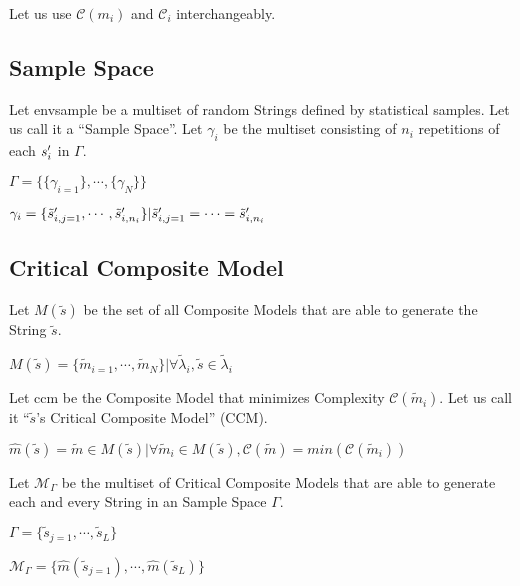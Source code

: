 \documentclass{article}
\begin{document}
Let us use $\mathcal{C}(m_i)$ and $\mathcal{C}_i$ interchangeably.

\subsection{Sample Space}

Let \gls{envsample} be a multiset of random Strings defined by statistical samples. Let us call it a ``Sample Space''. Let $\gamma_i$ be the multiset consisting of $n_i$ repetitions of each $ s_i \rq$ in $\Gamma$. 

\begin{center}

$\Gamma = \{ \{ \gamma_{i=1} \}, \cdots,  \{ \gamma_N\}\}$

$\gamma_i = \{ \tilde{s}_{i, j=1}  \rq, \cdots, \tilde{ s}_{i, n_i}  \rq \} | \tilde{ s}_{i, j=1} \rq = \cdots = \tilde{ s}_{i, n_i} \rq$

\end{center}

\subsection{Critical Composite Model}

Let $M(\tilde{ s})$ be the set of all Composite Models that are able to generate the String $\tilde{ s}$. 

\begin{center}
$M(\tilde{ s}) = \{\tilde{m}_{i=1}, \cdots, \tilde{m}_{N}\} | \forall \tilde\lambda_i, \tilde{ s} \in \tilde \lambda_i$
\end{center}

Let \gls{ccm} be the Composite Model that minimizes Complexity $\mathcal{C}(\tilde m_i)$. Let us call it ``$\tilde{ s}$'s Critical Composite Model'' (CCM).

\begin{center}
$\hat m(\tilde{ s}) = \tilde m \in M(\tilde{ s}) | \forall \tilde m_i \in M(\tilde{s}), \mathcal{C}(\tilde m) = min(\mathcal{C}(\tilde m_i))$

\end{center}

Let $\mathcal{M}_\Gamma$ be the multiset of Critical Composite Models that are able to generate each and every String in an Sample Space $\Gamma$.

\begin{center}
$\Gamma = \{ \tilde s_{j=1}, \cdots, \tilde s_L\}$

$\mathcal{M}_\Gamma = \{\hat m(\tilde s_{j=1}), \cdots, \hat m(\tilde s_L)\}$
\end{center}
\end{document}
